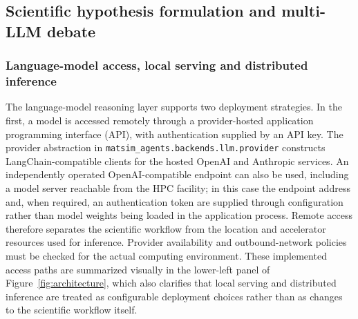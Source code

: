 \documentclass[11pt,a4paper]{article}
\begin{document}
\clearpage

\clearpage

\subsection{Scientific hypothesis formulation and multi-LLM debate}

\subsubsection{Language-model access, local serving and distributed inference}
\label{sec:methods:llm_deployment}
The language-model reasoning layer supports two deployment strategies. In the first, a model is accessed remotely through a provider-hosted application programming interface (API), with authentication supplied by an API key. The provider abstraction in \texttt{matsim\_agents.backends.llm.provider} constructs LangChain-compatible clients for the hosted OpenAI and Anthropic services. An independently operated OpenAI-compatible endpoint can also be used, including a model server reachable from the HPC facility; in this case the endpoint address and, when required, an authentication token are supplied through configuration rather than model weights being loaded in the application process. Remote access therefore separates the scientific workflow from the location and accelerator resources used for inference. Provider availability and outbound-network policies must be checked for the actual computing environment.
These implemented access paths are summarized visually in the lower-left panel of Figure~\ref{fig:architecture}, which also clarifies that local serving and distributed inference are treated as configurable deployment choices rather than as changes to the scientific workflow itself.
\end{document}
